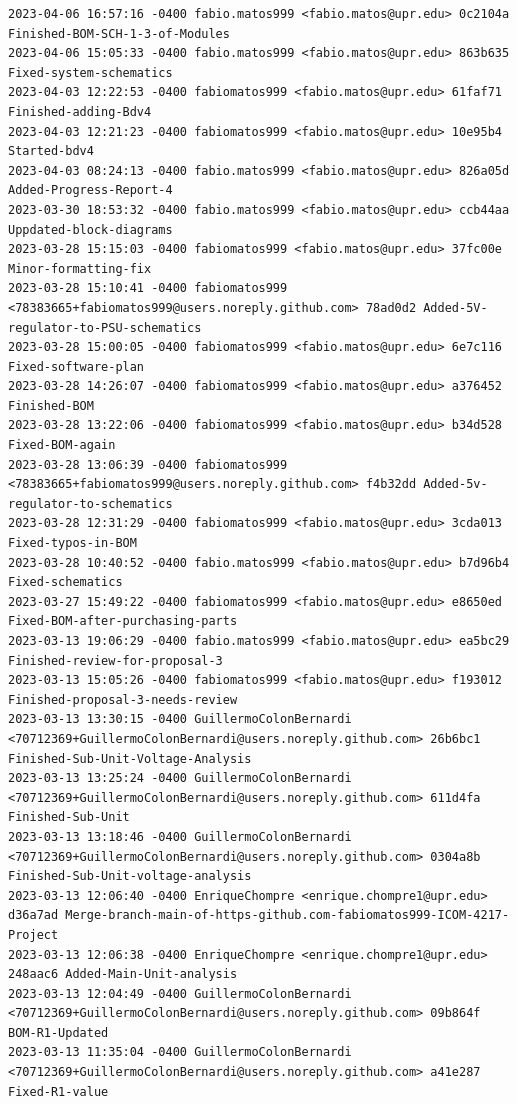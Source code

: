 \documentclass[12pt]{article}
\begin{document}
\begin{lstlisting}
2023-04-06 16:57:16 -0400 fabio.matos999 <fabio.matos@upr.edu> 0c2104a Finished-BOM-SCH-1-3-of-Modules
2023-04-06 15:05:33 -0400 fabio.matos999 <fabio.matos@upr.edu> 863b635 Fixed-system-schematics
2023-04-03 12:22:53 -0400 fabiomatos999 <fabio.matos@upr.edu> 61faf71 Finished-adding-Bdv4
2023-04-03 12:21:23 -0400 fabiomatos999 <fabio.matos@upr.edu> 10e95b4 Started-bdv4
2023-04-03 08:24:13 -0400 fabio.matos999 <fabio.matos@upr.edu> 826a05d Added-Progress-Report-4
2023-03-30 18:53:32 -0400 fabio.matos999 <fabio.matos@upr.edu> ccb44aa Uppdated-block-diagrams
2023-03-28 15:15:03 -0400 fabiomatos999 <fabio.matos@upr.edu> 37fc00e Minor-formatting-fix
2023-03-28 15:10:41 -0400 fabiomatos999 <78383665+fabiomatos999@users.noreply.github.com> 78ad0d2 Added-5V-regulator-to-PSU-schematics
2023-03-28 15:00:05 -0400 fabiomatos999 <fabio.matos@upr.edu> 6e7c116 Fixed-software-plan
2023-03-28 14:26:07 -0400 fabiomatos999 <fabio.matos@upr.edu> a376452 Finished-BOM
2023-03-28 13:22:06 -0400 fabiomatos999 <fabio.matos@upr.edu> b34d528 Fixed-BOM-again
2023-03-28 13:06:39 -0400 fabiomatos999 <78383665+fabiomatos999@users.noreply.github.com> f4b32dd Added-5v-regulator-to-schematics
2023-03-28 12:31:29 -0400 fabiomatos999 <fabio.matos@upr.edu> 3cda013 Fixed-typos-in-BOM
2023-03-28 10:40:52 -0400 fabio.matos999 <fabio.matos@upr.edu> b7d96b4 Fixed-schematics
2023-03-27 15:49:22 -0400 fabiomatos999 <fabio.matos@upr.edu> e8650ed Fixed-BOM-after-purchasing-parts
2023-03-13 19:06:29 -0400 fabio.matos999 <fabio.matos@upr.edu> ea5bc29 Finished-review-for-proposal-3
2023-03-13 15:05:26 -0400 fabiomatos999 <fabio.matos@upr.edu> f193012 Finished-proposal-3-needs-review
2023-03-13 13:30:15 -0400 GuillermoColonBernardi <70712369+GuillermoColonBernardi@users.noreply.github.com> 26b6bc1 Finished-Sub-Unit-Voltage-Analysis
2023-03-13 13:25:24 -0400 GuillermoColonBernardi <70712369+GuillermoColonBernardi@users.noreply.github.com> 611d4fa Finished-Sub-Unit
2023-03-13 13:18:46 -0400 GuillermoColonBernardi <70712369+GuillermoColonBernardi@users.noreply.github.com> 0304a8b Finished-Sub-Unit-voltage-analysis
2023-03-13 12:06:40 -0400 EnriqueChompre <enrique.chompre1@upr.edu> d36a7ad Merge-branch-main-of-https-github.com-fabiomatos999-ICOM-4217-Project
2023-03-13 12:06:38 -0400 EnriqueChompre <enrique.chompre1@upr.edu> 248aac6 Added-Main-Unit-analysis
2023-03-13 12:04:49 -0400 GuillermoColonBernardi <70712369+GuillermoColonBernardi@users.noreply.github.com> 09b864f BOM-R1-Updated
2023-03-13 11:35:04 -0400 GuillermoColonBernardi <70712369+GuillermoColonBernardi@users.noreply.github.com> a41e287 Fixed-R1-value

\end{lstlisting}
\end{document}

